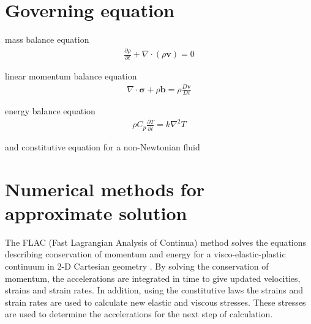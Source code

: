\documentclass[letterpaper,12pt,notitle]{memphisthesis}                     %
\begin{document}

\section{Governing equation}
mass balance equation
\begin{align}
 \frac{\partial \rho}{\partial t} + \nabla \cdot (\rho \mathbf{v}) = 0
\end{align}

linear momentum balance equation
\begin{align}
\nabla \cdot \boldsymbol{\sigma} + \rho \mathbf{b} = \rho \frac{D \mathbf{v}}{Dt}
\end{align}

energy balance equation
\begin{align}
\rho C_{p} \frac{\partial T}{\partial t} = k \nabla^2 T
\end{align}

and constitutive equation for a non-Newtonian fluid


\section{Numerical methods for approximate solution}
The FLAC (Fast Lagrangian Analysis of Continua) method \citep{Cundall1982, Poliakov1993} solves the equations describing conservation of momentum and energy for a visco-elastic-plastic continuum in 2-D Cartesian geometry \citep{Lavier2002}. By solving the conservation of momentum, the accelerations are integrated in time to give updated velocities, strains and strain rates. In addition, using the constitutive laws the strains and strain rates are used to calculate new elastic and viscous stresses. These stresses are used to determine the accelerations for the next step of calculation.
\end{document}
